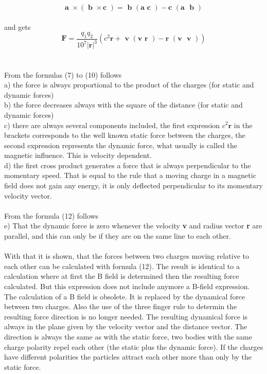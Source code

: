 \documentclass[10pt,titlepage]{article}
\begin{document}
\begin{equation}
\textbf{a }\times (\textbf{ b } \times  \textbf{c })=\textbf{ b }(\textbf{a }\textbf{c }) - \textbf{c }(\textbf{a }\textbf{ b })
\end{equation}\\
and gets
\begin{equation}
\textbf{F} = \frac{q_1q_2}{10^7\vert\textbf{r}\vert^3}  (c^2\textbf{r}  +   \textbf{ v }(\textbf{v }\textbf{r }) - \textbf{r }(\textbf{v }\textbf{ v }))
\end{equation}
\\
\\
From the formulas (7) to (10) follows
\\a) the force is always proportional to the product of the charges (for static and dynamic forces)
\\b) the force decreases always with the square of the distance (for static and dynamic forces)
\\c) there are always several components included, the first expression $c^2\textbf{r}$ in the brackets corresponds to the well known static force between the charges, the second expression represents the dynamic force, what usually is called the magnetic influence. This is velocity dependent. 
\\d) the first cross product generates a force that is always perpendicular to the momentary speed. That is equal to the rule that a moving charge in a magnetic field does not gain any energy, it is only deflected perpendicular to its momentary velocity vector.
\\
\\
From the formula (12) follows
\\e) That the dynamic force is zero whenever the velocity \textbf{v } and radius vector \textbf{r } are parallel, and this can only be if they are on the same line to each other.
\\
\\
With that it is shown, that the forces between two charges moving relative to each other can be calculated with formula (12). The result is identical to a calculation where at first the B field is determined then  the resulting force calculated.
But this expression does not include anymore a B-field expression. The calculation of a B field is obsolete.
It is replaced by the dynamical force between two charges.
Also the use of the three finger rule to determin the resulting force direction is no longer needed. The resulting dynamical force is always in the plane given by the velocity vector and the distance vector. The direction is always the same as with the static force, two bodies with the same charge polarity repel each other (the static plus the dynamic force). If the charges have different polarities the particles attract each other more than only by the static force.
\end{document}

